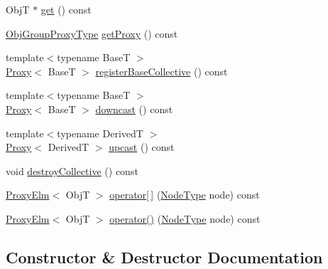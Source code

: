 \begin{DoxyCompactItemize}
\item 
ObjT $\ast$ \hyperlink{structvt_1_1objgroup_1_1proxy_1_1_proxy_a62eef779c097c8398e249827e4ad7c6a}{get} () const
\item 
\hyperlink{namespacevt_ad7cae989df485fccca57f0792a880a8e}{Obj\+Group\+Proxy\+Type} \hyperlink{structvt_1_1objgroup_1_1proxy_1_1_proxy_a76cda2351cf7801abe2ebffa1403c5b8}{get\+Proxy} () const
\item 
{\footnotesize template$<$typename BaseT $>$ }\\\hyperlink{structvt_1_1objgroup_1_1proxy_1_1_proxy}{Proxy}$<$ BaseT $>$ \hyperlink{structvt_1_1objgroup_1_1proxy_1_1_proxy_a3504fe25af8c839995a98d445af37282}{register\+Base\+Collective} () const
\item 
{\footnotesize template$<$typename BaseT $>$ }\\\hyperlink{structvt_1_1objgroup_1_1proxy_1_1_proxy}{Proxy}$<$ BaseT $>$ \hyperlink{structvt_1_1objgroup_1_1proxy_1_1_proxy_ae672794dc83491200d7f6e794865a6bc}{downcast} () const
\item 
{\footnotesize template$<$typename DerivedT $>$ }\\\hyperlink{structvt_1_1objgroup_1_1proxy_1_1_proxy}{Proxy}$<$ DerivedT $>$ \hyperlink{structvt_1_1objgroup_1_1proxy_1_1_proxy_a10217747f1bdd8b59e6f5f76290de8e0}{upcast} () const
\item 
void \hyperlink{structvt_1_1objgroup_1_1proxy_1_1_proxy_a6758c7979d1f69722449cb78f998cbf1}{destroy\+Collective} () const
\item 
\hyperlink{structvt_1_1objgroup_1_1proxy_1_1_proxy_elm}{Proxy\+Elm}$<$ ObjT $>$ \hyperlink{structvt_1_1objgroup_1_1proxy_1_1_proxy_a00a267a8730fe2547776ff0136ea3895}{operator\mbox{[}$\,$\mbox{]}} (\hyperlink{namespacevt_a866da9d0efc19c0a1ce79e9e492f47e2}{Node\+Type} node) const
\item 
\hyperlink{structvt_1_1objgroup_1_1proxy_1_1_proxy_elm}{Proxy\+Elm}$<$ ObjT $>$ \hyperlink{structvt_1_1objgroup_1_1proxy_1_1_proxy_ac290e4d37f05dc1183c205a1b9ee44cd}{operator()} (\hyperlink{namespacevt_a866da9d0efc19c0a1ce79e9e492f47e2}{Node\+Type} node) const
\end{DoxyCompactItemize}


\subsection{Constructor \& Destructor Documentation}
\mbox{\label{structvt_1_1objgroup_1_1proxy_1_1_proxy_a5450776d9cabb2556765c0d0227c9589}} 
